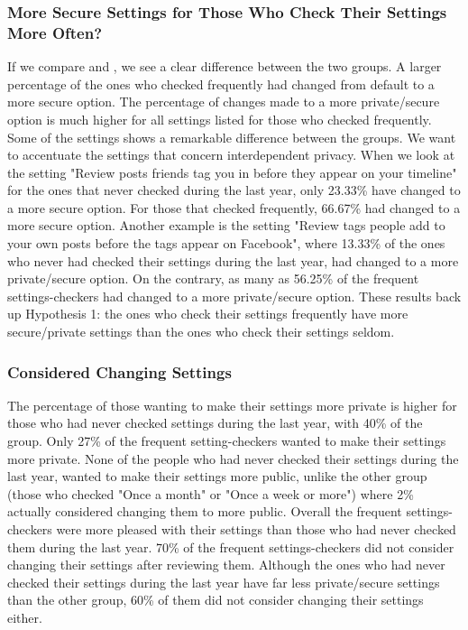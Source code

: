 \subsubsection{More Secure Settings for Those Who Check Their Settings More Often?}
If we compare  and , we see a clear difference between the two groups. A larger percentage of the ones who checked frequently had changed from default to a more secure option. The percentage of changes made to a more private/secure option is much higher for all settings listed for those who checked frequently. Some of the settings shows a remarkable difference between the groups. We want to accentuate the settings that concern interdependent privacy. When we look at the setting "Review posts friends tag you in before they appear on your timeline" for the ones that never checked during the last year, only 23.33\% have changed to a more secure option. For those that checked frequently, 66.67\% had changed to a more secure option. Another example is the setting "Review tags people add to your own posts before the tags appear on Facebook", where 13.33\% of the ones who never had checked their settings during the last year, had changed to a more private/secure option. On the contrary, as many as 56.25\% of the frequent settings-checkers had changed to a more private/secure option. These results back up Hypothesis 1: the ones who check their settings frequently have more secure/private settings than the ones who check their settings seldom. 

\subsubsection{Considered Changing Settings}
The percentage of those wanting to make their settings more private is higher for those who had never checked settings during the last year, with 40\% of the group. Only 27\% of the frequent setting-checkers wanted to make their settings more private. 
None of the people who had never checked their settings during the last year, wanted to make their settings more public, unlike the other group (those who checked "Once a month" or "Once a week or more") where 2\% actually considered changing them to more public. Overall the frequent settings-checkers were more pleased with their settings than those who had never checked them during the last year. 70\% of the frequent settings-checkers did not consider changing their settings after reviewing them. Although the ones who had never checked their settings during the last year have far less private/secure settings than the other group, 60\% of them did not consider changing their settings either. 

